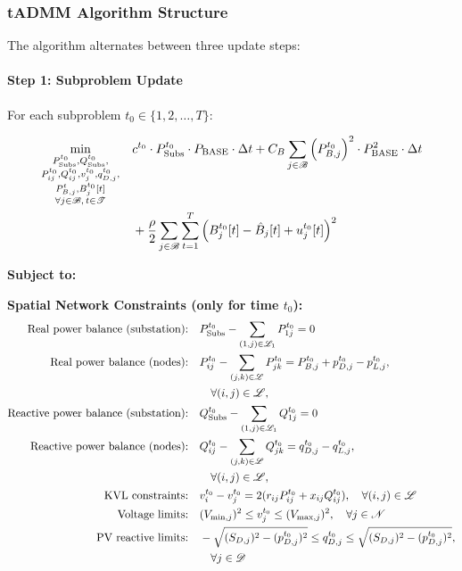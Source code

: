 \subsubsection{tADMM Algorithm Structure}

The algorithm alternates between three update steps:

\paragraph{Step 1: Subproblem Update}
For each subproblem $t_0 \in \{1, 2, \ldots, T\}$:

\begin{align}
\min_{\substack{P_{\text{Subs}}^{t_0}, Q_{\text{Subs}}^{t_0}, \\ P_{ij}^{t_0}, Q_{ij}^{t_0}, v_j^{t_0}, q_{D,j}^{t_0}, \\ P_{B,j}^t, B_j^{t_0}[t] \\ \forall j \in \mathcal{B}, \, t \in \mathcal{T}}} \quad & c^{t_0} \cdot P_{\text{Subs}}^{t_0} \cdot P_{\text{BASE}} \cdot \Delta t + C_B \sum_{j \in \mathcal{B}} \left(P_{B,j}^{t_0}\right)^2 \cdot P_{\text{BASE}}^2 \cdot \Delta t \notag \\
& + \frac{\rho}{2} \sum_{j \in \mathcal{B}} \sum_{t=1}^T \left( B_j^{t_0}[t] - \hat{B}_j[t] + u_j^{t_0}[t] \right)^2
\end{align}

\textbf{Subject to:}

\textbf{Spatial Network Constraints (only for time $t_0$):}
\begin{align}
\text{Real power balance (substation):} \quad & P_{\text{Subs}}^{t_0} - \sum_{(1,j) \in \mathcal{L}_1} P_{1j}^{t_0} = 0 \\
\text{Real power balance (nodes):} \quad & P_{ij}^{t_0} - \sum_{(j,k) \in \mathcal{L}} P_{jk}^{t_0} = P_{B,j}^{t_0} + p_{D,j}^{t_0} - p_{L,j}^{t_0}, \notag \\
& \quad \forall (i,j) \in \mathcal{L}, \\
\text{Reactive power balance (substation):} \quad & Q_{\text{Subs}}^{t_0} - \sum_{(1,j) \in \mathcal{L}_1} Q_{1j}^{t_0} = 0 \\
\text{Reactive power balance (nodes):} \quad & Q_{ij}^{t_0} - \sum_{(j,k) \in \mathcal{L}} Q_{jk}^{t_0} = q_{D,j}^{t_0} - q_{L,j}^{t_0}, \notag \\
& \quad \forall (i,j) \in \mathcal{L}, \\
\text{KVL constraints:} \quad & v_i^{t_0} - v_j^{t_0} = 2(r_{ij} P_{ij}^{t_0} + x_{ij} Q_{ij}^{t_0}), \quad \forall (i,j) \in \mathcal{L} \\
\text{Voltage limits:} \quad & (V_{\min,j})^2 \leq v_j^{t_0} \leq (V_{\max,j})^2, \quad \forall j \in \mathcal{N} \\
\text{PV reactive limits:} \quad & -\sqrt{(S_{D,j})^2 - (p_{D,j}^{t_0})^2} \leq q_{D,j}^{t_0} \leq \sqrt{(S_{D,j})^2 - (p_{D,j}^{t_0})^2}, \notag \\
& \quad \forall j \in \mathcal{D}
\end{align}

